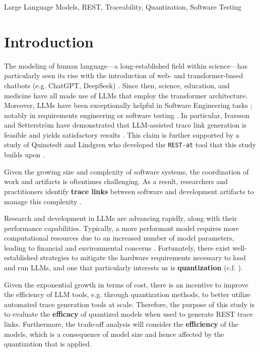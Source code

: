 \documentclass[conference]{IEEEtran}
\begin{document}
\begin{IEEEkeywords}
Large Language Models, REST, Traceability, Quantization, Software Testing
\end{IEEEkeywords}

\section{Introduction}\label{sec:intro}

The modeling of human language---a long-established field within science---has particularly seen its rise with the introduction of web- and transformer-based chatbots (e.g. ChatGPT, DeepSeek) \cite{jones1994Natural,vaswani2017Attention,naveed2024Comprehensive}. Since then, science, education, and medicine have all made use of LLMs that employ the transformer architecture. Moreover, LLMs have been exceptionally helpful in Software Engineering tasks \cite{naveed2024Comprehensive}; notably in requirements engineering \cite{arora2024Advancing} or software testing \cite{dakhel2024Effective, wang2024Software}. In particular, Ivarsson and Setterström have demonstrated that LLM-assisted trace link generation is feasible and yields satisfactory results \cite{ivarsson2023automated}. This claim is further supported by a study of Quinstedt and Lindgren who developed the \verb|REST-at| tool that this study builds upon \cite{quinstedt2024Optimizing}. 

Given the growing size and complexity of software systems, the coordination of work and artifacts is oftentimes challenging. As a result, researchers and practitioners identify \textbf{trace links} between software and development artifacts to manage this complexity \cite{jaber2013Effect}.

Research and development in LLMs are advancing rapidly, along with their performance capabilities. Typically, a more performant model requires more computational resources due to an increased number of model parameters, leading to financial and environmental concerns \cite{naveed2024Comprehensive}. Fortunately, there exist well-established strategies to mitigate the hardware requirements necessary to load and run LLMs, and one that particularly interests us is \textbf{quantization} (c.f. \cite{shen2024exploring, frantar2023GPTQ, lin2024AWQ, chen2024EfficientQAT}). 

Given the exponential growth in terms of cost, there is an incentive to improve the efficiency of LLM tools, e.g. through quantization methods, to better utilize automated trace generation tools at scale. Therefore, the purpose of this study is to evaluate the \textbf{efficacy} of quantized models when used to generate REST trace links. Furthermore, the trade-off analysis will consider the \textbf{efficiency} of the models, which is a consequence of model size and hence affected by the quantization that is applied.
\end{document}
